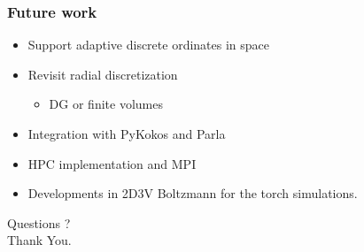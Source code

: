 \documentclass[mathserif, aspectratio=169]{beamer}
\newcommand{\vtheta}{{v_{\theta}}}
\begin{document}
\begin{frame}
	\frametitle{Future work}
	\begin{itemize}
		\item Support adaptive discrete ordinates in space
		\item Revisit radial discretization
		\begin{itemize}
			\item DG or finite volumes
		\end{itemize}
		\item Integration with PyKokos and Parla
		\item HPC implementation and MPI
		\item Developments in 2D3V Boltzmann for the torch simulations.
	\end{itemize}
\end{frame}

\begin{frame}
	\centering
	\Huge Questions ? \\
	\centering
	\Huge Thank You. 
\end{frame}
\end{document}
